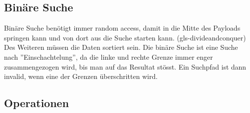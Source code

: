 \subsection{Binäre Suche}
Binäre Suche benötigt immer random access, damit in die Mitte des Payloads springen kann und von dort aus die Suche starten kann. (\gls{gls-divideandconquer}) Des Weiteren müssen die Daten sortiert sein. Die binäre Suche ist eine Suche nach ''Einschachtelung'', da die linke und rechte Grenze immer enger zusammengezogen wird, bis man auf das Resultat stösst. Ein Suchpfad ist dann invalid, wenn eine der Grenzen überschritten wird.

\clearpage

\subsection{Operationen}
